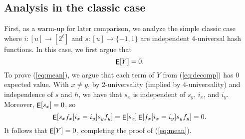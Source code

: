 \documentclass[12pt]{article}
\DeclareMathOperator*{\E}{\sf{E}}
\newcommand{\req}[1]{(\ref{#1})}
\newcommand\fct\rightarrow
\begin{document}
\subsection{Analysis in the classic case}
First, as a warm-up for later comparison, we analyze the simple classic case
where $i:[u]\fct[2^\ell]$ and
$s:[u]\fct\{-1,1\}$ are independent 4-universal hash
functions. In this case, we first argue that 
\begin{equation}\label{eq:mean}
\E[Y]=0.
\end{equation}
To prove \req{eq:mean}, we argue that each term of
$Y$ from \req{eq:decomp} has 0 expected value. With $x\neq y$, by 2-universality (implied by 4-universality) and independence of $s$ and $h$, we have that $s_x$ is independent of $s_y$, $i_x$, and $i_y$.
Moreover, $\E[s_x]=0$, 
so 
\[\E[s_x f_x[i_x=i_y]s_y f_y]=\E[s_x]\E[f_x[i_x=i_y]s_y f_y]=0.\]
It follows that $\E[Y]=0$, completing the proof of \req{eq:mean}.
\end{document}
